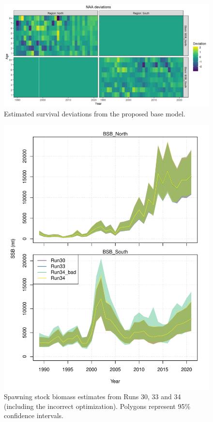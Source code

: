 \documentclass[
]{article}
\begin{document}
\begin{figure}

{\centering \includegraphics[width=1\linewidth]{../2023.RT.Runs/Run34/plots_png/results/NAA_dev_tile} 

}

\caption{Estimated survival deviations from the proposed base model.}\label{fig:NAA-devs}
\end{figure}

\begin{figure}

{\centering \includegraphics{bsb_models_wp_files/figure-latex/SSB-compare-1} 

}

\caption{Spawning stock biomass estimates from Runs 30, 33 and 34 (including the incorrect optimization). Polygons represent 95\% confidence intervals.}\label{fig:SSB-compare}
\end{figure}
\end{document}
